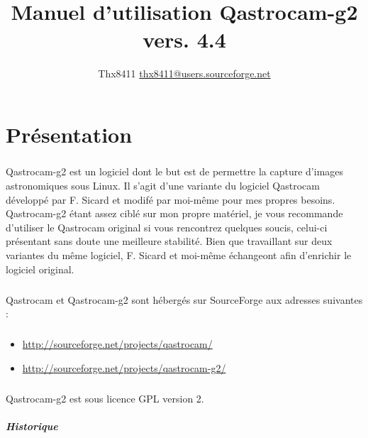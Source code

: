 \documentclass[11pt,a4paper]{book}
\title{Manuel d'utilisation Qastrocam-g2 vers. 4.4}
\author{Thx8411 \url{thx8411@users.sourceforge.net}}
\begin{document}
\maketitle

\tableofcontents

\chapter{Pr\'esentation}

\paragraph*{}
Qastrocam-g2 est un logiciel dont le but est de permettre la capture d'images
astronomiques sous Linux. Il s'agit d'une variante du logiciel Qastrocam d\'evelopp\'e
par F. Sicard et modif\'e par moi-m\^eme pour mes propres besoins. Qastrocam-g2 \'etant
assez cibl\'e sur mon propre mat\'eriel, je vous recommande d'utiliser le Qastrocam
original si vous rencontrez quelques soucis, celui-ci pr\'esentant sans doute une
meilleure stabilit\'e. Bien que travaillant sur deux variantes du m\^eme logiciel, F.
Sicard et moi-m\^eme \'echangeont afin d'enrichir le logiciel original.

\paragraph*{}
Qastrocam et Qastrocam-g2 sont h\'eberg\'es sur SourceForge aux adresses suivantes :

\paragraph*{}
\begin{itemize}
\item \url{http://sourceforge.net/projects/qastrocam/}
\item \url{http://sourceforge.net/projects/qastrocam-g2/}
\end{itemize}

\paragraph*{}
Qastrocam-g2 est sous licence GPL version 2.

\paragraph*{Historique}
\end{document}
